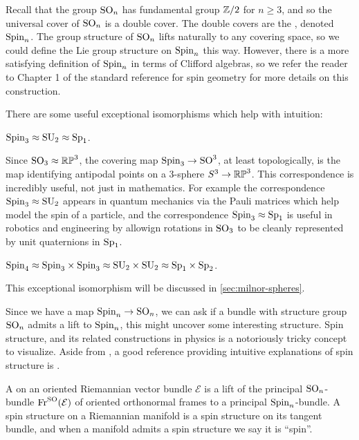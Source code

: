 Recall that the group $\mathrm{SO}_n$ has fundamental group $\mathbb{Z}/2$ for $n\geq 3$, and so the universal cover of $\mathrm{SO}_n$ is a double cover. The double covers are the , denoted $\mathrm{Spin}_n$.
The group structure of $\mathrm{SO}_n$ lifts naturally to any covering space, so we could define the Lie group structure on $\mathrm{Spin}_n$ this way. However, there is a more satisfying definition of $\mathrm{Spin}_n$ in terms of Clifford algebras, so we refer the reader to Chapter 1 of the standard reference for spin geometry \cite{lawson1989spin} for more details on this construction.

There are some useful exceptional isomorphisms which help with intuition:
\begin{example}
	$\mathrm{Spin}_3\approx \mathrm{SU}_2\approx \mathrm{Sp}_1$.

	Since $\mathrm{SO}_3\approx \mathbb{RP}^3$, the covering map $\mathrm{Spin}_3 \to \mathrm{SO}^3$, at least topologically, is the map identifying antipodal points on a $3$-sphere $S^3\to \mathbb{RP}^3$. This correspondence is incredibly useful, not just in mathematics. For example the correspondence $\mathrm{Spin}_3\approx \mathrm{SU}_2$ appears in quantum mechanics via the Pauli matrices which help model the spin of a particle, and the correspondence $\mathrm{Spin}_3\approx \mathrm{Sp}_1$ is useful in robotics and engineering by allowign rotations in $\mathrm{SO}_3$ to be cleanly represented by unit quaternions in $\mathrm{Sp}_1$.
\end{example}
\begin{example}
	$\mathrm{Spin}_4\approx \mathrm{Spin}_3\times\mathrm{Spin}_3\approx \mathrm{SU}_2\times \mathrm{SU}_2\approx \mathrm{Sp}_1\times \mathrm{Sp}_2$.

	This exceptional isomorphism will be discussed in \cref{sec:milnor-spheres}.
\end{example}

Since we have a map $\mathrm{Spin}_n \to \mathrm{SO}_n$, we can ask if a bundle with structure group $\mathrm{SO}_n$ admits a lift to $\mathrm{Spin}_n$, this might uncover some interesting structure. Spin structure, and its related constructions in physics is a notoriously tricky concept to visualize. Aside from \cite{lawson1989spin}, a good reference providing intuitive explanations of spin structure is \cite{nakahara2003}.

\begin{definition}
	A  on an oriented Riemannian vector bundle $\mathcal{E}$ is a lift of the principal $\mathrm{SO}_n$-bundle $\operatorname{Fr}^{\mathrm{SO}}(\mathcal{E})$ of oriented orthonormal frames to a principal $\mathrm{Spin}_n$-bundle. A spin structure on a Riemannian manifold is a spin structure on its tangent bundle, and when a manifold admits a spin structure we say it is ``spin''.
\end{definition}

